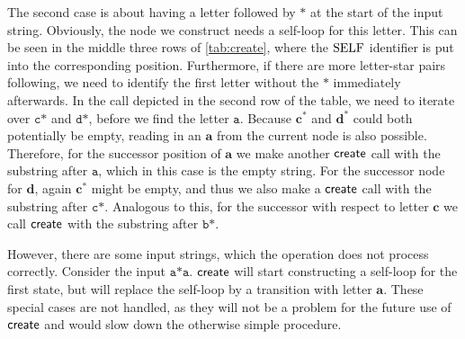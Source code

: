 The second case is about having a letter followed by $\texttt{*}$ at the start of the input string. Obviously, the node we construct needs a self-loop for this letter. This can be seen in the middle three rows of \autoref{tab:create}, where the $\mathrm{SELF}$ identifier is put into the corresponding position. 
Furthermore, if there are more letter-star pairs following, we need to identify the first letter without the $\texttt{*}$ immediately afterwards. In the call depicted in the second row of the table, we need to iterate over $\texttt{c*}$ and $\texttt{d*}$, before we find the letter $\texttt{a}$. Because $\bm{c^{*}}$ and $\bm{d^{*}}$ could both potentially be empty, reading in an $\bm{a}$ from the current node is also possible. Therefore, for the successor position of $\bm{a}$ we make another $\operatorname{\textsf{create}}$ call with the substring after $\texttt{a}$, which in this case is the empty string.
For the successor node for $\bm{d}$, again $\bm{c^{*}}$ might be empty, and thus we also make a 
$\operatorname{\textsf{create}}$ call with the substring after $\texttt{c*}$. Analogous to this, for the successor with respect to letter $\bm{c}$ we call $\operatorname{\textsf{create}}$ with the substring after $\texttt{b*}$. 

However, there are some input strings, which the operation does not process correctly. Consider the input $\texttt{a*a}$. $\operatorname{\textsf{create}}$ will start constructing a self-loop for the first state, but will replace the self-loop by a transition with letter $\bm{a}$. 
These special cases are not handled, as they will not be a problem for the future use of $\operatorname{\textsf{create}}$ and would slow down the otherwise simple procedure. 

%


